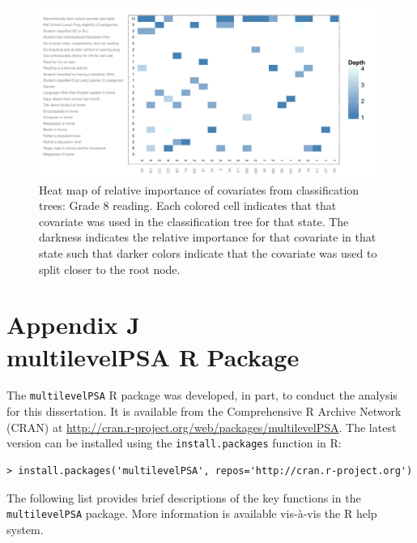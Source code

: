 \begin{figure}[h!]
\begin{center}
\includegraphics[height=.37\textheight]{../Figures2009/g8read-mlpsa-ctree-heat.pdf}
\caption[Heat map of relative importance of covariates from classification trees: Grade 8 reading]{Heat map of relative importance of covariates from classification trees: Grade 8 reading. Each colored cell indicates that that covariate was used in the classification tree for that state. The darkness indicates the relative importance for that covariate in that state such that darker colors indicate that the covariate was used to split closer to the root node.}
\label{fig:g8read-mlpsa-ctree-heat}
\end{center}
\end{figure}


\clearpage
{}
\section*{Appendix J\\multilevelPSA R Package}
\label{appendixJ}

The \texttt{multilevelPSA} R package was developed, in part, to conduct the analysis for this dissertation. It is available from the Comprehensive R Archive Network (CRAN) at \url{http://cran.r-project.org/web/packages/multilevelPSA}. The latest version can be installed using the \texttt{install.packages} function in R:

\begin{verbatim}
> install.packages('multilevelPSA', repos='http://cran.r-project.org')
\end{verbatim}

The following list provides brief descriptions of the key functions in the \texttt{multilevelPSA} package. More information is available vis-\`a-vis the R help system.

